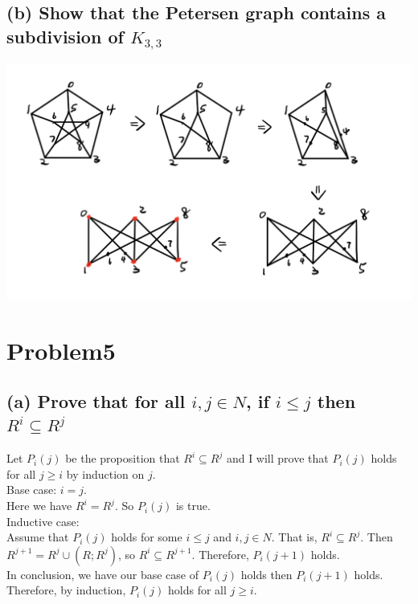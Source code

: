 \documentclass[]{article}
\begin{document}
\begin{spacing}{1.5}
		\subsection*{(b) Show that the Petersen graph contains a subdivision of $ K_{3,3}$}
		\includegraphics{4}
		
		\section*{Problem5}
		\subsection*{(a) Prove that for all $ i, j \in N $, if $ i \leq j $ then $ R^i \subseteq R^j $}
		Let $ P_i(j) $ be the proposition that $ R^i \subseteq R^j $ and I will prove that $ P_i(j) $ holds for all $ j \geq i $ by induction on $ j $.\\
		Base case: $ i = j $. \\
		Here we have $ R^i = R^j $. So $ P_i(j) $ is true.\\
		Inductive case: \\
		Assume that $ P_i(j) $ holds for some $ i \leq j$ and $i, j \in N $. That is, $ R^i \subseteq R^j $. Then $ R^{j+1}  = R^j \cup (R; R^j)$, so $ R^i \subseteq R^{j+1} $. Therefore, $ P_i(j+1) $ holds.\\
		In conclusion, we have our base case of $ P_i(j) $ holds then $ P_i(j+1) $ holds. Therefore, by induction, $ P_i(j) $ holds for all $ j \geq i $.
		

\end{spacing}
\end{document}
